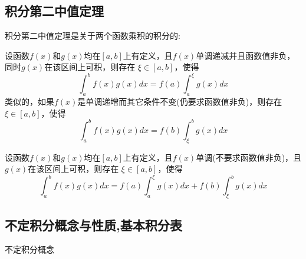 \subsection{积分第二中值定理}
\label{sec:second-midvalue-theorem-for-integral}

积分第二中值定理是关于两个函数乘积的积分的:
\begin{theorem}[积分第二中值定理]
  设函数$f(x)$和$g(x)$均在$[a,b]$上有定义，且$f(x)$单调递减并且函数值非负，同时$g(x)$在该区间上可积，则存在 $\xi \in [a,b]$，使得
  \[ \int_a^{b} f(x)g(x)dx=f(a)\int_a^{\xi}g(x)dx \]
  类似的，如果$f(x)$是单调递增而其它条件不变(仍要求函数值非负)，则存在$\xi \in [a,b]$，使得
  \[ \int_a^{b} f(x)g(x)dx=f(b)\int_{\xi}^{b}g(x)dx \]
\end{theorem}

\begin{inference}
  设函数$f(x)$和$g(x)$均在$[a,b]$上有定义，且$f(x)$单调(不要求函数值非负)，且$g(x)$在该区间上可积，则存在 $\xi \in [a,b]$，使得
  \[ \int_a^{b}f(x)g(x)dx = f(a)\int_a^{\xi}g(x)dx+f(b)\int_{\xi}^{b}g(x)dx \]
\end{inference}


\subsection{不定积分概念与性质,基本积分表}
\label{sec:indefinite-integral}

不定积分概念












